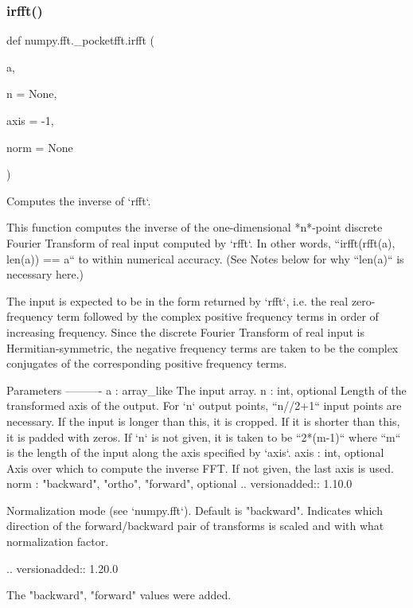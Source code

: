 \subsubsection{\texorpdfstring{irfft()}{irfft()}}
{\footnotesize\ttfamily def numpy.\+fft.\+\_\+pocketfft.\+irfft (\begin{DoxyParamCaption}\item[{}]{a,  }\item[{}]{n = {\ttfamily None},  }\item[{}]{axis = {\ttfamily -\/1},  }\item[{}]{norm = {\ttfamily None} }\end{DoxyParamCaption})}

\begin{DoxyVerb}Computes the inverse of `rfft`.

This function computes the inverse of the one-dimensional *n*-point
discrete Fourier Transform of real input computed by `rfft`.
In other words, ``irfft(rfft(a), len(a)) == a`` to within numerical
accuracy. (See Notes below for why ``len(a)`` is necessary here.)

The input is expected to be in the form returned by `rfft`, i.e. the
real zero-frequency term followed by the complex positive frequency terms
in order of increasing frequency.  Since the discrete Fourier Transform of
real input is Hermitian-symmetric, the negative frequency terms are taken
to be the complex conjugates of the corresponding positive frequency terms.

Parameters
----------
a : array_like
    The input array.
n : int, optional
    Length of the transformed axis of the output.
    For `n` output points, ``n//2+1`` input points are necessary.  If the
    input is longer than this, it is cropped.  If it is shorter than this,
    it is padded with zeros.  If `n` is not given, it is taken to be
    ``2*(m-1)`` where ``m`` is the length of the input along the axis
    specified by `axis`.
axis : int, optional
    Axis over which to compute the inverse FFT. If not given, the last
    axis is used.
norm : {"backward", "ortho", "forward"}, optional
    .. versionadded:: 1.10.0

    Normalization mode (see `numpy.fft`). Default is "backward".
    Indicates which direction of the forward/backward pair of transforms
    is scaled and with what normalization factor.

    .. versionadded:: 1.20.0

        The "backward", "forward" values were added.


\end{DoxyVerb}
